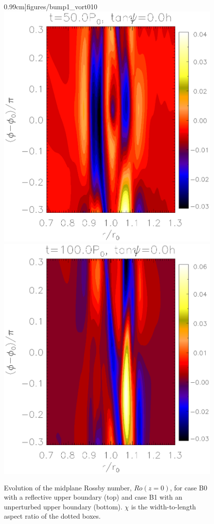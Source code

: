 \begin{figure}
     0.99cm]{figures/bump1_vort010}\includegraphics[scale=.27,clip=true,trim=2.3cm
     0.cm 0.cm
     0.99cm]{figures/bump1_vort014}\includegraphics[scale=.27,clip=true,clip=true,trim=2.3cm
     0.cm 0.cm
     0.99cm]{figures/bump1_vort019}
   \caption{Evolution of the midplane Rossby number, $Ro(z=0)$, for case B0 with a reflective upper boundary (top) and case
     B1  with an unperturbed upper boundary (bottom). $\chi$ is the
     width-to-length aspect ratio of the dotted boxes. 
   \label{bump0_bump1_vort}}
 \end{figure}

